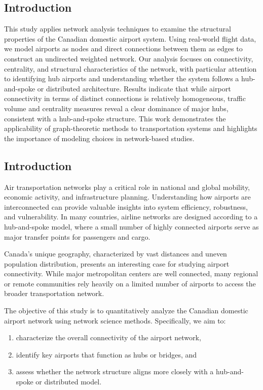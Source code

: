 \documentclass[9pt]{article}
\begin{document}
\subsection{Introduction}

This study applies network analysis techniques to examine the structural properties of the Canadian domestic airport system. Using real-world flight data, we model airports as nodes and direct connections between them as edges to construct an undirected weighted network. Our analysis focuses on connectivity, centrality, and structural characteristics of the network, with particular attention to identifying hub airports and understanding whether the system follows a hub-and-spoke or distributed architecture. Results indicate that while airport connectivity in terms of distinct connections is relatively homogeneous, traffic volume and centrality measures reveal a clear dominance of major hubs, consistent with a hub-and-spoke structure. This work demonstrates the applicability of graph-theoretic methods to transportation systems and highlights the importance of modeling choices in network-based studies.

\subsection{Introduction}

Air transportation networks play a critical role in national and global mobility, economic activity, and infrastructure planning. Understanding how airports are interconnected can provide valuable insights into system efficiency, robustness, and vulnerability. In many countries, airline networks are designed according to a hub-and-spoke model, where a small number of highly connected airports serve as major transfer points for passengers and cargo.

Canada’s unique geography, characterized by vast distances and uneven population distribution, presents an interesting case for studying airport connectivity. While major metropolitan centers are well connected, many regional or remote communities rely heavily on a limited number of airports to access the broader transportation network.

The objective of this study is to quantitatively analyze the Canadian domestic airport network using network science methods. Specifically, we aim to:
\begin{enumerate}[label=\arabic*.]
    \item characterize the overall connectivity of the airport network,
    \item identify key airports that function as hubs or bridges, and
    \item assess whether the network structure aligns more closely with a hub-and-spoke or distributed model.
\end{enumerate}
\end{document}
